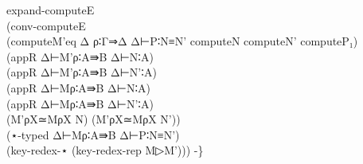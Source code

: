 {\begin{code}
{\>    expand-computeE \<\\
\>      (conv-computeE \<\\
\>        (computeM'eq Δ ρ∶Γ⇒Δ Δ⊢P∶N≡N' computeN computeN' computeP₁) \<\\
\>        (appR Δ⊢M'ρ∶A⇛B Δ⊢N∶A) \<\\
\>        (appR Δ⊢M'ρ∶A⇛B Δ⊢N'∶A)\<\\
\>        (appR Δ⊢Mρ∶A⇛B Δ⊢N∶A) \<\\
\>        (appR Δ⊢Mρ∶A⇛B Δ⊢N'∶A)\<\\
\>        (M'ρX≃MρX N) (M'ρX≃MρX N'))\<\\
\>      (⋆-typed Δ⊢Mρ∶A⇛B Δ⊢P∶N≡N') \<\\
\>      (key-redex-⋆ (key-redex-rep M▷M'))) -\}}\<%
\\
%
\\
\> \AgdaSymbol{:}  \AgdaSymbol{\{}\AgdaSymbol{\}} \AgdaSymbol{\{}\AgdaSymbol{\}}       \AgdaSymbol{(} \AgdaSymbol{)}    \AgdaSymbol{(} \AgdaSymbol{)}  \<%
\\
\> \AgdaSymbol{\{} \AgdaSymbol{=} \AgdaSymbol{\}}  \AgdaSymbol{(} \AgdaSymbol{(} \AgdaSymbol{)} \AgdaSymbol{)}  \AgdaSymbol{=}    \<%
\\
\> \AgdaSymbol{\{}\AgdaSymbol{\}} \AgdaSymbol{\{} \AgdaSymbol{=} \AgdaSymbol{\}}    \AgdaSymbol{=} \AgdaFunction{Σ[}    \AgdaFunction{]} \AgdaFunction{Σ[}      \AgdaFunction{]}         \<%
\\
\> \AgdaSymbol{\{} \AgdaSymbol{=} \AgdaSymbol{\}}  \AgdaSymbol{(} \AgdaSymbol{(} \AgdaSymbol{)} \AgdaSymbol{(} \AgdaInductiveConstructor{,,}  \AgdaInductiveConstructor{,,} \AgdaSymbol{))}  \AgdaSymbol{=}      \<%

\end{code}}
